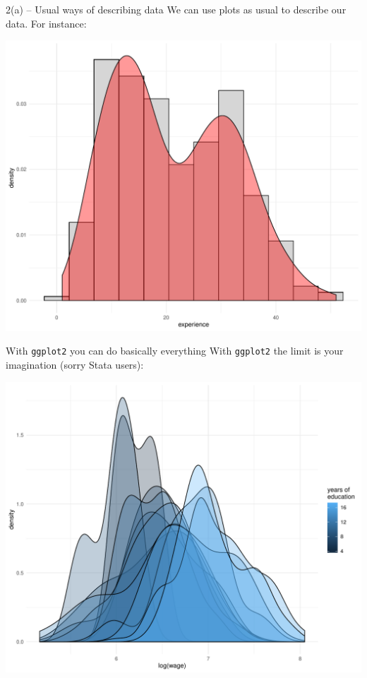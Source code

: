 \documentclass[xcolor=table,dvipsnames]{beamer}
\begin{document}
\begin{frame}{2(a) -- Usual ways of describing data}
We can use plots as usual to describe our data. For instance: \pause
\begin{center}
\includegraphics[scale=0.4]{pictures/week_23_histdens.pdf}
\end{center}
\end{frame}

\begin{frame}{With \texttt{ggplot2} you can do basically everything}
With \texttt{ggplot2} the limit is your imagination (sorry Stata users): \pause
\begin{center}
\includegraphics[scale=0.4]{pictures/week_23_dens.pdf}
\end{center}
\end{frame}
\end{document}
